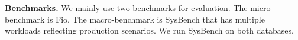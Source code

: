 
{\bf Benchmarks.} 
We mainly use two benchmarks for evaluation.
The micro-benchmark is Fio. %
The macro-benchmark is SysBench \cite{Sysbench38:online} that
  has multiple workloads reflecting production scenarios.
We run SysBench on both databases.





    

    
